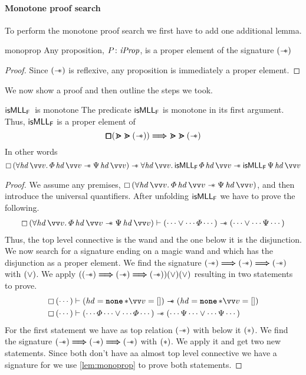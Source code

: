 \documentclass[thesis.tex]{subfiles}
\begin{document}
\paragraph*{Monotone proof search}
To perform the monotone proof search we first have to add one additional lemma.
\begin{lemma}{}{monoprop}
    Any proposition, $P\colon \textit{iProp}$, is a proper element of the signature
    $(\mathrel{-\!\!\ast})$
\end{lemma}
\begin{proof}
    Since $(\mathrel{-\!\!\ast})$ is reflexive, any proposition is immediately a proper element.
\end{proof}
We now show a proof and then outline the steps we took.
\begin{example}{$\textsf{\upshape isMLL}_{\textsf{\upshape F}}$\ is monotone}{}
    The predicate $\textsf{\upshape isMLL}_{\textsf{\upshape F}}$ is monotone in its first argument. Thus, $\textsf{\upshape isMLL}_{\textsf{\upshape F}}$ is a proper element of
    \[
        \pmb{\mathop{\boxempty}} (\bm{\gtrdot} \bm{\gtrdot} (\mathrel{-\!\!\ast})) \bm{\Longrightarrow} \bm{\gtrdot} \bm{\gtrdot} (\mathrel{-\!\!\ast})
    \]
    In other words
    \[
        \always{(\All \hd\, \vect{v}. \pred\, \hd\, \vect{v} \wand \predB\, \hd\, \vect{v})} \wand \All \hd\, \vect{v}. \isMLL_\hopred\, \pred\, \hd\, \vect{v} \wand \isMLL_\hopred\, \predB\, \hd\, \vect{v}
    \]


    \begin{proof}
        We assume any premises, $\always{(\All \hd\, \vect{v}. \pred\, \hd\, \vect{v} \wand \predB\, \hd\, \vect{v})}$, and then introduce the universal quantifiers. After unfolding $\textsf{\upshape isMLL}_{\textsf{\upshape F}}$ we have to prove the following.
        \begin{align*}
            \always{(\All \hd\, \vect{v}. \pred\, \hd\, \vect{v} \wand \predB\, \hd\, \vect{v})} \proves (\cdots \lor \cdots \pred \cdots) \wand (\cdots \lor \cdots \predB \cdots)
        \end{align*}
        Thus, the top level connective is the wand and the one below it is the disjunction. We now search for a signature ending on a magic wand and which has the disjunction as a proper element. We find the signature ${(\mathrel{-\!\!\ast}) \bm{\Longrightarrow} (\mathrel{-\!\!\ast}) \bm{\Longrightarrow} (\mathrel{-\!\!\ast})}$ with $(\lor)$. We apply $((\mathrel{-\!\!\ast}) \bm{\Longrightarrow} (\mathrel{-\!\!\ast}) \bm{\Longrightarrow} (\mathrel{-\!\!\ast})) (\lor) (\lor)$ resulting in two statements to prove.
        \begin{align*}
            \always{(\cdots)} & \proves (\hd = \None * \vect{\val} = []) \wand (\hd = \None * \vect{\val} = [])                                \\
            \always{(\cdots)} & \proves (\cdots \pred \cdots \lor \cdots  \pred \cdots) \wand (\cdots \predB \cdots \lor \cdots \predB \cdots)
        \end{align*}
        For the first statement we have as top relation $(\mathrel{-\!\!\ast})$ with below it $(*)$. We find the signature ${(\mathrel{-\!\!\ast}) \bm{\Longrightarrow} (\mathrel{-\!\!\ast}) \bm{\Longrightarrow} (\mathrel{-\!\!\ast})}$ with $(*)$. We apply it and get two new statements. Since both don't have aa almost top level connective we have a signature for we use \cref*{lem:monoprop} to prove both statements.


\end{proof}
\end{example}
\end{document}

